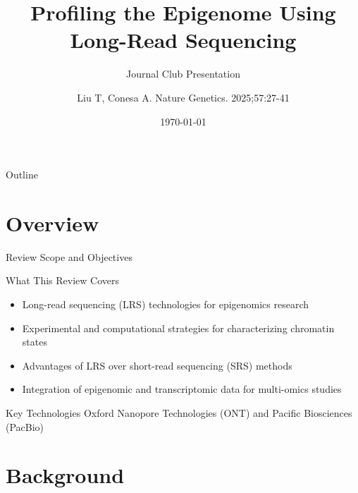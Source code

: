 \documentclass[aspectratio=169]{beamer}
\title{Profiling the Epigenome Using Long-Read Sequencing}
\subtitle{Journal Club Presentation}
\author[Presenter]{Liu T, Conesa A. Nature Genetics. 2025;57:27-41}
\date{\today}
\institute[]{%
  \begin{flushleft}
    Journal Club Discussion\\
    \small\today
  \end{flushleft}%
}
\begin{document}
\begin{frame}[plain]
  \titlepage
\end{frame}

\begin{frame}{Outline}
  \tableofcontents[hideallsubsections]
\end{frame}

\section{Overview}

\begin{frame}{Review Scope and Objectives}
  \begin{block}{What This Review Covers}
    \begin{itemize}
      \item Long-read sequencing (LRS) technologies for epigenomics research
      \item Experimental and computational strategies for characterizing chromatin states
      \item Advantages of LRS over short-read sequencing (SRS) methods
      \item Integration of epigenomic and transcriptomic data for multi-omics studies
    \end{itemize}
  \end{block}

  \vspace{0.3cm}

  \begin{alertblock}{Key Technologies}
    Oxford Nanopore Technologies (ONT) and Pacific Biosciences (PacBio)
  \end{alertblock}
\end{frame}

\section{Background}
\end{document}
